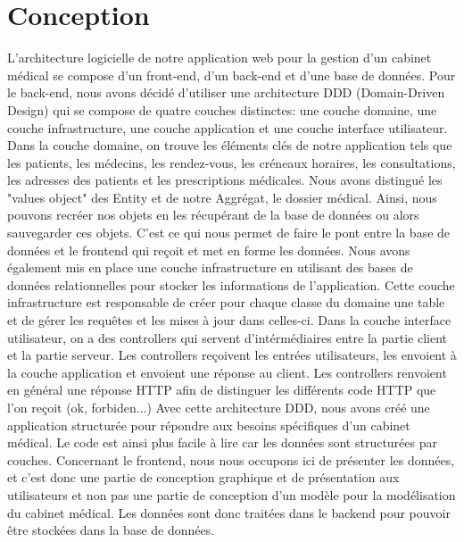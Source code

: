 \documentclass[a4paper]{report}
\begin{document}
\chapter{Conception}


L'architecture logicielle de notre application web pour la gestion d'un cabinet médical se compose d'un front-end, d'un back-end et d'une base de données.
Pour le back-end, nous avons décidé d'utiliser une architecture DDD (Domain-Driven Design) qui se compose de quatre couches distinctes: une couche domaine, 
une couche infrastructure, une couche application et une couche interface utilisateur. \newline \newline
Dans la couche domaine, on trouve les éléments clés de notre application tels que les patients, les médecins, les rendez-vous, les créneaux horaires, les consultations, 
les adresses des patients et les prescriptions médicales. 
Nous avons distingué les "values object" des Entity et de notre Aggrégat, le dossier médical. Ainsi, nous pouvons recréer nos objets en les récupérant de la base de données ou
alors sauvegarder ces objets. C'est ce qui nous permet de faire le pont entre la base de données et le frontend qui reçoit et met en forme les données.\newline \newline
Nous avons également mis en place une couche infrastructure en utilisant des bases de 
données relationnelles pour stocker les informations de l'application. Cette couche infrastructure est responsable de créer 
pour chaque classe du domaine une table et de gérer les requêtes et les mises à jour dans celles-ci. \newline \newline
Dans la couche interface utilisateur, on a des controllers qui servent d'intérmédiaires entre la partie client et la partie serveur. 
Les controllers reçoivent les entrées utilisateurs, les envoient à la couche application et envoient une réponse au client. Les controllers renvoient en général
une réponse HTTP afin de distinguer les différents code HTTP que l'on reçoit (ok, forbiden...) \newline \newline
Avec cette architecture DDD, nous avons créé une application structurée pour répondre aux besoins spécifiques d'un cabinet médical. Le code est ainsi plus facile à lire
car les données sont structurées par couches.\newline\newline
Concernant le frontend, nous nous occupons ici de présenter les données, et c'est donc une partie de conception graphique et de présentation aux utilisateurs et non pas une partie
de conception d'un modèle pour la modélisation du cabinet médical. Les données sont donc traitées dans le backend pour pouvoir être stockées dans la base de données.
\end{document}
